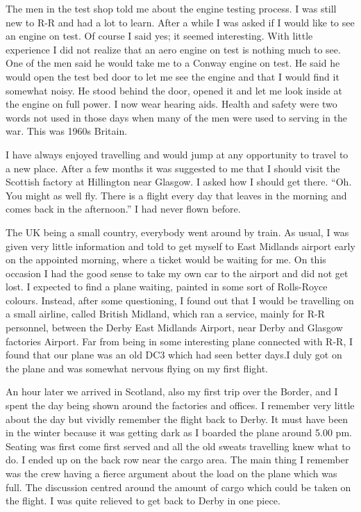 The men in the test shop told me about the engine testing process. I
was still new to R-R and had a lot to learn. After a while I was asked
if I would like to see an engine on test. Of course I said yes; it
seemed interesting. With little experience I did not realize that an
aero engine on test is nothing much to see. One of the men said he
would take me to a Conway engine on test. He said he would open the
test bed door to let me see the engine and that I would find it
somewhat noisy. He stood behind the door, opened it and let me look
inside at the engine on full power. I now wear hearing aids. Health
and safety were two words not used in those days when many of the men
were used to serving in the war. This was 1960s Britain.

I have always enjoyed travelling and would jump at any opportunity to
travel to a new place. After a few months it was suggested to me that
I should visit the Scottish factory at Hillington near Glasgow. I
asked how I should get there. ``Oh. You might as well fly. There is a
flight every day that leaves in the morning and comes back in the
afternoon.'' I had never flown before.

The UK being a small country, everybody went around by train.  As
usual, I was given very little information and told to get myself to
East Midlands airport early on the appointed morning, where a ticket
would be waiting for me. On this occasion I had the good sense to take
my own car to the airport and did not get lost. I expected to find a
plane waiting, painted in some sort of Rolls-Royce colours. Instead,
after some questioning, I found out that I would be travelling on a
small airline, called British Midland, which ran a service, mainly for
R-R personnel, between the Derby East Midlands Airport, near Derby and
Glasgow factories Airport. Far from being in some interesting plane
connected with R-R, I found that our plane was an old DC3 which had
seen better days.I duly got on the plane and was somewhat nervous
flying on my first flight.

An hour later we arrived in Scotland, also my first trip over the
Border, and I spent the day being shown around the factories and
offices.  I remember very little about the day but vividly remember
the flight back to Derby. It must have been in the winter because it
was getting dark as I boarded the plane around 5.00 pm. Seating was
first come first served and all the old sweats travelling knew what to
do. I ended up on the back row near the cargo area. The main thing I
remember was the crew having a fierce argument about the load on the
plane which was full. The discussion centred around the amount of
cargo which could be taken on the flight. I was quite relieved to get
back to Derby in one piece.

